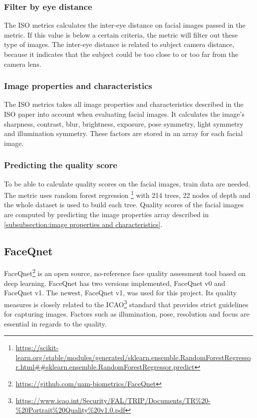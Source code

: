 \subsubsection*{Filter by eye distance}
The ISO metrics calculates the inter-eye distance on facial images passed in the metric. If this value is below a certain criteria, the metric will filter out these type of images. The inter-eye distance is related to subject camera distance, because it indicates that the subject could be too close to or too far from the camera lens. 

\subsubsection*{Image properties and characteristics}
\label{subsubsection:image properties and characteristics}
The ISO metrics takes all image properties and characteristics described in the ISO paper into account when evaluating facial images. It calculates the image's sharpness, contrast, blur, brightness, exposure, pose symmetry, light symmetry and illumination symmetry. These factors are stored in an array for each facial image. 

\subsubsection*{Predicting the quality score}
To be able to calculate quality scores on the facial images, train data are needed. The metric uses random forest regression \footnote{\url{https://scikit-learn.org/stable/modules/generated/sklearn.ensemble.RandomForestRegressor.html##sklearn.ensemble.RandomForestRegressor.predict}} with 214 trees, 22 nodes of depth and the whole dataset is used to build each tree. Quality scores of the facial images are computed by predicting the image properties array described in \ref{subsubsection:image properties and characteristics}. 

\subsection{FaceQnet}
FaceQnet\footnote{\url{https://github.com/uam-biometrics/FaceQnet}} is an open source, no-reference face quality assessment tool based on deep learning. FaceQnet has two versions implemented, FaceQnet v0 and FaceQnet v1. The newest, FaceQnet v1, was used for this project. Its quality measures is closely related to the ICAO\footnote{\url{https://www.icao.int/Security/FAL/TRIP/Documents/TR\%20-\%20Portrait\%20Quality\%20v1.0.pdf}} standard that provides strict guidelines for capturing images. Factors such as illumination, pose, resolution and focus are essential in regards to the quality.

